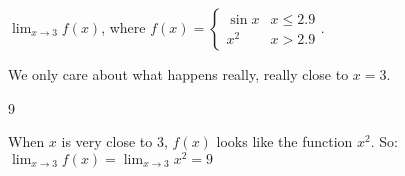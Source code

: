 \begin{Mquestion}\label{s1.3last}
$\displaystyle\lim_{x \rightarrow 3} f(x)$, where $f(x)=\left\{
\begin{array}{ll}
\sin x&x\leq 2.9\\
x^2&x>2.9
\end{array}
\right.$.
\end{Mquestion}
\begin{hint}
We only care about what happens really, really close to $x=3$.
\end{hint}
\begin{answer}
9
\end{answer}
\begin{solution}
When $x$ is very close to 3, $f(x)$ looks like the function $x^2$. So:
$\displaystyle\lim_{x \rightarrow 3} f(x) =
\displaystyle\lim_{x \rightarrow 3} x^2=9$
\end{solution}
